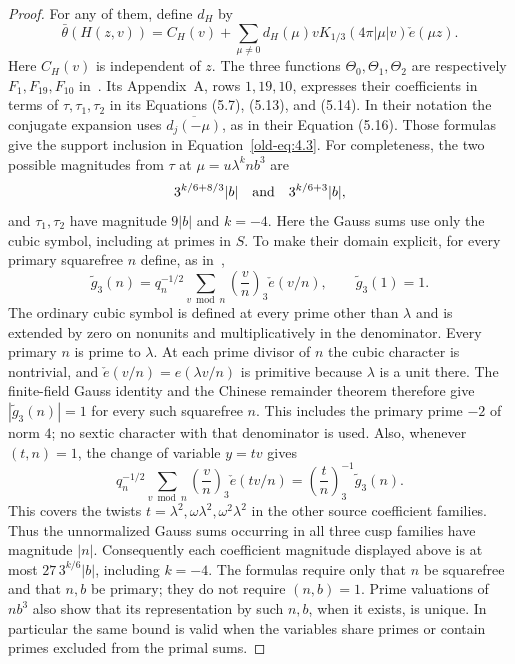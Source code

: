 \documentclass[11pt,a4paper]{article}
\numberwithin{equation}{section}
\numberwithin{figure}{section}
\theoremstyle{definition}
\theoremstyle{remark}
\begin{document}
\begin{proof}
For any of them, define $d_H$ by
\begin{equation}\label{eq:reflection-cusp-expansion}
 \bar\theta(H(z,v))=C_H(v)+
 \sum_{\mu\ne0}d_H(\mu)vK_{1/3}(4\pi|\mu|v)\check e(\mu z).
\end{equation}
Here $C_H(v)$ is independent of $z$.
The three functions $\Theta_0,\Theta_1,\Theta_2$ are respectively
$F_1,F_{19},F_{10}$ in~\cite{DR}.  Its Appendix~A, rows $1,19,10$,
expresses their coefficients in terms of $\tau,\tau_1,\tau_2$ in its
Equations (5.7), (5.13), and (5.14).  In their notation the conjugate
expansion uses $\overline{d_j(-\mu)}$, as in their Equation (5.16).
Those formulas give the support inclusion in
Equation~\eqref{old-eq:4.3}.  For completeness, the two possible
magnitudes from $\tau$ at $\mu=u\lambda^k n b^3$ are
\[
 3^{k/6+8/3}|b|\quad\hbox{and}\quad3^{k/6+3}|b|,
\]
and $\tau_1,\tau_2$ have magnitude $9|b|$ and $k=-4$.
Here the Gauss sums use only the cubic symbol, including at primes in $S$.
To make their domain explicit, for every primary squarefree $n$ define,
as in~\cite[Equation (1.7)]{DR},
\begin{equation}\label{eq:reflection-cubic-source-gauss}
 \widetilde g_3(n)=q_n^{-1/2}\sum_{v\bmod n}
       \left(\frac vn\right)_3\check e(v/n),
 \qquad \widetilde g_3(1)=1.
\end{equation}
The ordinary cubic symbol is defined at every prime other than $\lambda$
and is extended by zero on nonunits and multiplicatively in the denominator.
Every primary $n$ is prime to $\lambda$.  At each prime divisor of $n$ the
cubic character is nontrivial, and $\check e(v/n)=e(\lambda v/n)$ is primitive
because $\lambda$ is a unit there.  The finite-field Gauss identity and the
Chinese remainder theorem therefore give $|\widetilde g_3(n)|=1$ for every
such squarefree $n$.  This includes the primary prime $-2$ of norm $4$;
no sextic character with that denominator is used.  Also, whenever $(t,n)=1$,
the change of variable $y=tv$ gives
\[
 q_n^{-1/2}\sum_{v\bmod n}\left(\frac vn\right)_3\check e(tv/n)
       =\left(\frac tn\right)_3^{-1}\widetilde g_3(n).
\]
This covers the twists $t=\lambda^2,\omega\lambda^2,\omega^2\lambda^2$
in the other source coefficient families.  Thus the unnormalized Gauss sums
occurring in all three cusp families have magnitude $|n|$.  Consequently
each coefficient magnitude displayed above is at most
$27\,3^{k/6}|b|$, including $k=-4$.  The formulas require only that
$n$ be squarefree and that $n,b$ be primary; they do not require
$(n,b)=1$.  Prime valuations of $nb^3$ also show that its representation
by such $n,b$, when it exists, is unique.  In particular the same bound
is valid when the variables share primes or contain primes excluded
from the primal sums.


\end{proof}
\end{document}
